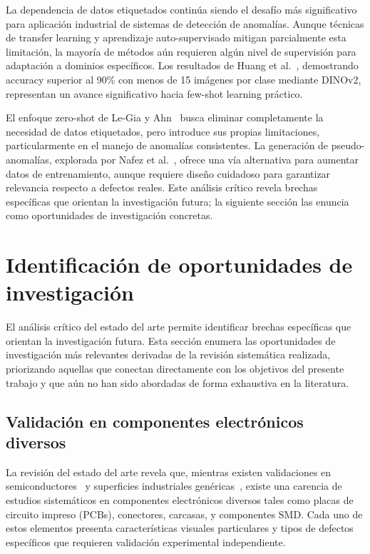 La dependencia de datos etiquetados continúa siendo el desafío más significativo para aplicación industrial de sistemas de detección de anomalías. Aunque técnicas de transfer learning y aprendizaje auto-supervisado mitigan parcialmente esta limitación, la mayoría de métodos aún requieren algún nivel de supervisión para adaptación a dominios específicos. Los resultados de Huang et al.~\cite{huang2025semiconductor}, demostrando accuracy superior al 90\% con menos de 15 imágenes por clase mediante DINOv2, representan un avance significativo hacia few-shot learning práctico.

El enfoque zero-shot de Le-Gia y Ahn~\cite{legia2025consistent} busca eliminar completamente la necesidad de datos etiquetados, pero introduce sus propias limitaciones, particularmente en el manejo de anomalías consistentes. La generación de pseudo-anomalías, explorada por Nafez et al.~\cite{nafez2025patchguard}, ofrece una vía alternativa para aumentar datos de entrenamiento, aunque requiere diseño cuidadoso para garantizar relevancia respecto a defectos reales. Este análisis crítico revela brechas específicas que orientan la investigación futura; la siguiente sección las enuncia como oportunidades de investigación concretas.

\section{Identificación de oportunidades de investigación}

El análisis crítico del estado del arte permite identificar brechas específicas que orientan la investigación futura. Esta sección enumera las oportunidades de investigación más relevantes derivadas de la revisión sistemática realizada, priorizando aquellas que conectan directamente con los objetivos del presente trabajo y que aún no han sido abordadas de forma exhaustiva en la literatura.

\subsection{Validación en componentes electrónicos diversos}

La revisión del estado del arte revela que, mientras existen validaciones en semiconductores~\cite{huang2025semiconductor} y superficies industriales genéricas~\cite{zhang2025exploring,wang2022defect}, existe una carencia de estudios sistemáticos en componentes electrónicos diversos tales como placas de circuito impreso (PCBs), conectores, carcasas, y componentes SMD. Cada uno de estos elementos presenta características visuales particulares y tipos de defectos específicos que requieren validación experimental independiente.

